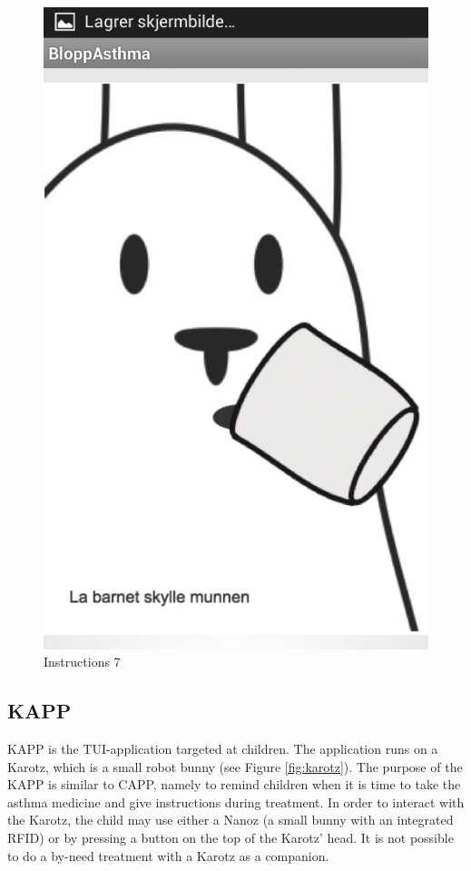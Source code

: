 \begin{figure}[H]
	\begin{minipage}[b]{0.3\linewidth}
		\centering
		\includegraphics[width=0.20\paperwidth]{Pictures/app-screenshots/instructions-7.png}
		\caption{Instructions 7}
		\label{fig:instructions-7}
	\end{minipage}
\end{figure}


\subsection{KAPP}
\label{sec:description-kapp}
KAPP is the TUI-application targeted at children. The application runs on a Karotz, which is a small robot bunny (see Figure \ref{fig:karotz}). The purpose of the KAPP is similar to CAPP, namely to remind children when it is time to take the asthma medicine and give instructions during treatment. In order to interact with the Karotz, the child may use either a Nanoz (a small bunny with an integrated RFID) or by pressing a button on the top of the Karotz' head. It is not possible to do a by-need treatment with a Karotz as a companion. 

